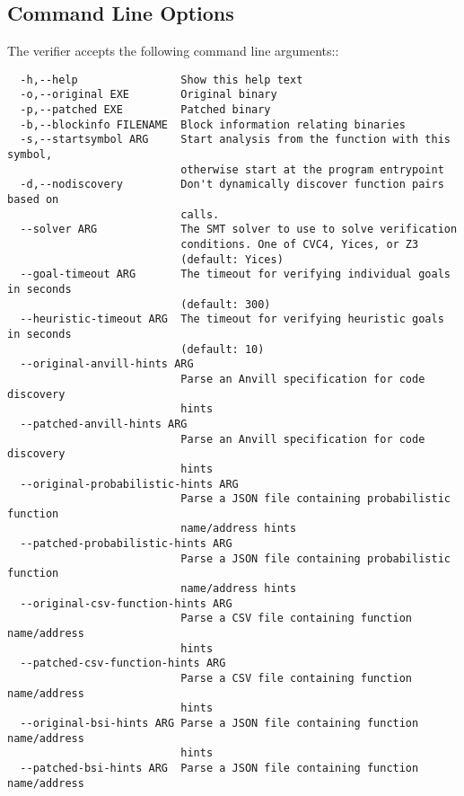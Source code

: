 

\subsection{Command Line Options}
The verifier accepts the following command line arguments::
\begin{verbatim}
  -h,--help                Show this help text
  -o,--original EXE        Original binary
  -p,--patched EXE         Patched binary
  -b,--blockinfo FILENAME  Block information relating binaries
  -s,--startsymbol ARG     Start analysis from the function with this symbol,
                           otherwise start at the program entrypoint
  -d,--nodiscovery         Don't dynamically discover function pairs based on
                           calls.
  --solver ARG             The SMT solver to use to solve verification
                           conditions. One of CVC4, Yices, or Z3
                           (default: Yices)
  --goal-timeout ARG       The timeout for verifying individual goals in seconds
                           (default: 300)
  --heuristic-timeout ARG  The timeout for verifying heuristic goals in seconds
                           (default: 10)
  --original-anvill-hints ARG
                           Parse an Anvill specification for code discovery
                           hints
  --patched-anvill-hints ARG
                           Parse an Anvill specification for code discovery
                           hints
  --original-probabilistic-hints ARG
                           Parse a JSON file containing probabilistic function
                           name/address hints
  --patched-probabilistic-hints ARG
                           Parse a JSON file containing probabilistic function
                           name/address hints
  --original-csv-function-hints ARG
                           Parse a CSV file containing function name/address
                           hints
  --patched-csv-function-hints ARG
                           Parse a CSV file containing function name/address
                           hints
  --original-bsi-hints ARG Parse a JSON file containing function name/address
                           hints
  --patched-bsi-hints ARG  Parse a JSON file containing function name/address

\end{verbatim}
